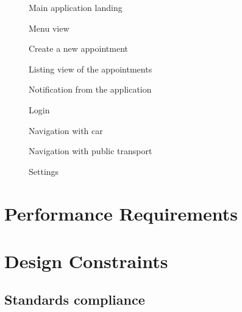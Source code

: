 \begin{figure}[H]
	\caption{Main application landing}
	\centerline{ } 
\end{figure}
\begin{figure}[H]
	\caption{Menu view}
	\centerline{ }
\end{figure}
\begin{figure}[H]
	\caption{Create a new appointment}
	\centerline{ }
\end{figure}
\begin{figure}[H]
	\caption{Listing view of the appointments}
	\centerline{ }
\end{figure}
\begin{figure}[H]
	\caption{Notification from the application}
	\centerline{ }
\end{figure}
\begin{figure}[H]
	\caption{Login}
	\centerline{ }
\end{figure}
\begin{figure}[H]
	\caption{Navigation with car}
	\centerline{ }
\end{figure}
\begin{figure}[H]
	\caption{Navigation with public transport}
	\centerline{ }
\end{figure}
\begin{figure}[H]
	\caption{Settings}
	\centerline{ }
\end{figure}

\section{Performance Requirements}
\label{sec:perf_req}

\section{Design Constraints}
\label{sec:design_constraints}

\subsection{Standards compliance}
